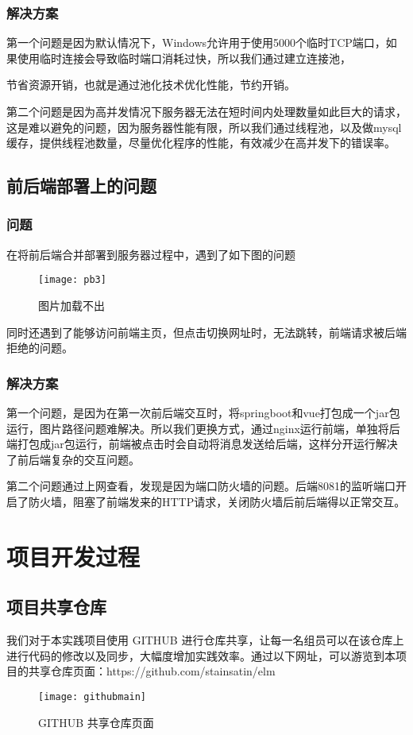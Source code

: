 \subsubsection{解决方案}
第一个问题是因为默认情况下，Windows允许用于使用5000个临时TCP端口，如果使用临时连接会导致临时端口消耗过快，所以我们通过建立连接池，

节省资源开销，也就是通过池化技术优化性能，节约开销。

第二个问题是因为高并发情况下服务器无法在短时间内处理数量如此巨大的请求，这是难以避免的问题，因为服务器性能有限，所以我们通过线程池，以及做mysql缓存，提供线程池数量，尽量优化程序的性能，有效减少在高并发下的错误率。

\subsection{前后端部署上的问题}
\subsubsection{问题}
在将前后端合并部署到服务器过程中，遇到了如下图的问题

\begin{figure}[htbp]
	\centering
	\texttt{[image: pb3]}
	\caption{图片加载不出}\label{fig:8.5}
	\vspace{\baselineskip}
\end{figure}

同时还遇到了能够访问前端主页，但点击切换网址时，无法跳转，前端请求被后端拒绝的问题。

\subsubsection{解决方案}
第一个问题，是因为在第一次前后端交互时，将springboot和vue打包成一个jar包运行，图片路径问题难解决。所以我们更换方式，通过nginx运行前端，单独将后端打包成jar包运行，前端被点击时会自动将消息发送给后端，这样分开运行解决了前后端复杂的交互问题。

第二个问题通过上网查看，发现是因为端口防火墙的问题。后端8081的监听端口开启了防火墙，阻塞了前端发来的HTTP请求，关闭防火墙后前后端得以正常交互。
\section{项目开发过程}
\subsection{项目共享仓库}
我们对于本实践项目使用 GITHUB 进行仓库共享，让每一名组员可以在该仓库上进行代码的修改以及同步，大幅度增加实践效率。通过以下网址，可以游览到本项目的共享仓库页面：https://github.com/stainsatin/elm
\begin{figure}[htbp]
    \centering
    \texttt{[image: githubmain]}
    \caption{GITHUB 共享仓库页面}\label{fig:githubmain}
    \vspace{\baselineskip}
\end{figure}

